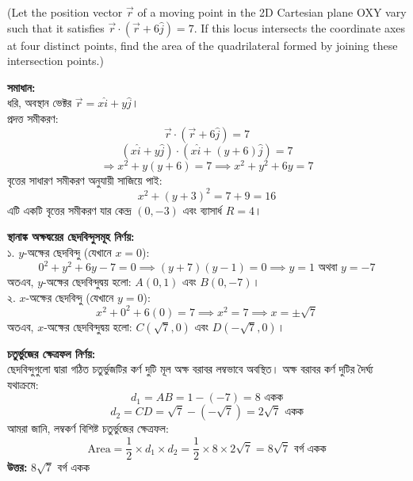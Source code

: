 \documentclass[12pt]{article}
\begin{document}
(Let the position vector $\vec{r}$ of a moving point in the 2D Cartesian plane OXY vary such that it satisfies $\vec{r} \cdot (\vec{r} + 6\hat{j}) = 7$. If this locus intersects the coordinate axes at four distinct points, find the area of the quadrilateral formed by joining these intersection points.)

\begin{center}
\end{center}

\textbf{সমাধান:} \\
ধরি, অবস্থান ভেক্টর $\vec{r} = x\hat{i} + y\hat{j}$। \\
প্রদত্ত সমীকরণ:
$$\vec{r} \cdot (\vec{r} + 6\hat{j}) = 7$$
$$(x\hat{i} + y\hat{j}) \cdot (x\hat{i} + (y+6)\hat{j}) = 7$$
$$\Rightarrow x^2 + y(y+6) = 7 \implies x^2 + y^2 + 6y = 7$$
বৃত্তের সাধারণ সমীকরণ অনুযায়ী সাজিয়ে পাই:
$$x^2 + (y+3)^2 = 7 + 9 = 16$$
এটি একটি বৃত্তের সমীকরণ যার কেন্দ্র $(0, -3)$ এবং ব্যাসার্ধ $R = 4$।

\textbf{স্থানাঙ্ক অক্ষদ্বয়ের ছেদবিন্দুসমূহ নির্ণয়:} \\
১. $y$-অক্ষের ছেদবিন্দু (যেখানে $x = 0$):
$$0^2 + y^2 + 6y - 7 = 0 \implies (y+7)(y-1) = 0 \implies y = 1 \text{ অথবা } y = -7$$
অতএব, $y$-অক্ষের ছেদবিন্দুদ্বয় হলো: $A(0, 1)$ এবং $B(0, -7)$। \\
২. $x$-অক্ষের ছেদবিন্দু (যেখানে $y = 0$):
$$x^2 + 0^2 + 6(0) = 7 \implies x^2 = 7 \implies x = \pm\sqrt{7}$$
অতএব, $x$-অক্ষের ছেদবিন্দুদ্বয় হলো: $C(\sqrt{7}, 0)$ এবং $D(-\sqrt{7}, 0)$।

\textbf{চতুর্ভুজের ক্ষেত্রফল নির্ণয়:} \\
ছেদবিন্দুগুলো দ্বারা গঠিত চতুর্ভুজটির কর্ণ দুটি মূল অক্ষ বরাবর লম্বভাবে অবস্থিত। অক্ষ বরাবর কর্ণ দুটির দৈর্ঘ্য যথাক্রমে:
$$d_1 = AB = 1 - (-7) = 8\text{ একক}$$
$$d_2 = CD = \sqrt{7} - (-\sqrt{7}) = 2\sqrt{7}\text{ একক}$$
আমরা জানি, লম্বকর্ণ বিশিষ্ট চতুর্ভুজের ক্ষেত্রফল:
$$\text{Area} = \frac{1}{2} \times d_1 \times d_2 = \frac{1}{2} \times 8 \times 2\sqrt{7} = 8\sqrt{7}\text{ বর্গ একক}$$
\textbf{উত্তর:} $8\sqrt{7}$ বর্গ একক
\end{document}
